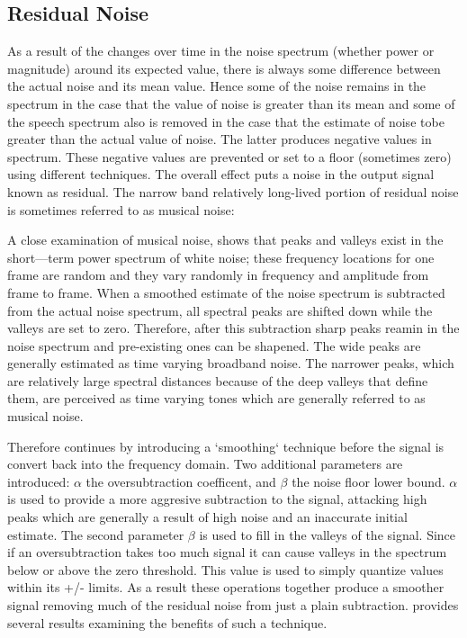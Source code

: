 \subsection{Residual Noise}

As a result of the changes over time in the noise spectrum (whether power or magnitude) around its expected value, there is always some difference between the actual noise and its mean value. Hence some of the noise remains in the spectrum in the case that the value of noise is greater than its mean and some of the speech spectrum also is removed in the case that the estimate of noise tobe greater than the actual value of noise. The latter produces negative values in spectrum. These negative values are prevented or set to a floor (sometimes zero) using different techniques. The overall effect puts a noise in the output signal known as residual. The narrow band relatively long-lived portion of residual noise is sometimes referred to as musical noise:

A close examination of musical noise, shows that peaks and valleys exist in the short—term power spectrum of white noise; these frequency locations for one frame are random and they vary randomly in frequency and amplitude from frame to frame. When a smoothed estimate of the noise spectrum is subtracted from the actual noise spectrum, all spectral peaks are shifted down while the valleys are set to zero. Therefore, after this subtraction sharp peaks reamin in the noise spectrum and pre-existing ones can be shapened. The wide peaks are generally estimated as time varying broadband noise. The narrower peaks, which are relatively large spectral distances because of the deep valleys that define them, are perceived as time varying tones which are generally referred to as musical noise\cite{berouti}.

Therefore \cite{boll} continues by introducing a `smoothing` technique before the signal is convert back into the frequency domain.  Two additional parameters are introduced: \( \alpha \) the oversubtraction coefficent, and \(\beta\) the noise floor lower bound.  \(\alpha\) is used to provide a more aggresive subtraction to the signal, attacking high peaks which are generally a result of high noise and an inaccurate initial estimate.  The second parameter \(\beta\) is used to fill in the valleys of the signal.  Since if an oversubtraction takes too much signal it can cause valleys in the spectrum below or above the zero threshold.  This value is used to simply quantize values within its +/- limits.  As a result these operations together produce a smoother signal removing much of the residual noise from just a plain subtraction.  \cite{boll} provides several results examining the benefits of such a technique.\\  


